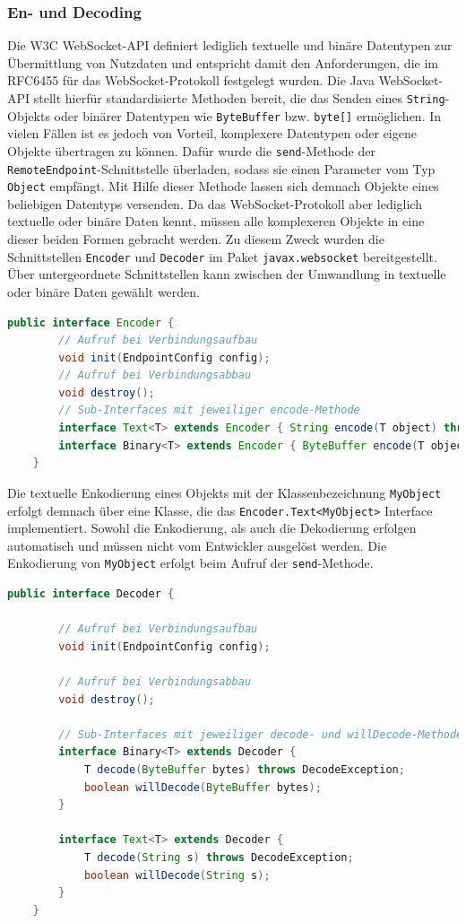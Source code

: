 \documentclass[11pt,a4paper,titlepage]{scrartcl}
\numberwithin{equation}{section}
\begin{document}
\subsubsection{En- und Decoding}\label{subsubsec:DeEnCoding}
Die W3C WebSocket-API definiert lediglich textuelle und binäre Datentypen zur Übermittlung von Nutzdaten und entspricht damit den Anforderungen, die im RFC6455 für das WebSocket-Protokoll festgelegt wurden. Die Java WebSocket-API stellt hierfür standardisierte Methoden bereit, die das Senden eines \texttt{String}-Objekts oder binärer Datentypen wie \texttt{ByteBuffer} bzw. \texttt{byte[]} ermöglichen. In vielen Fällen ist es jedoch von Vorteil, komplexere Datentypen oder eigene Objekte übertragen zu können. Dafür wurde die \texttt{send}-Methode der \texttt{RemoteEndpoint}-Schnittstelle überladen, sodass sie einen Parameter vom Typ \texttt{Object} empfängt. Mit Hilfe dieser Methode lassen sich demnach Objekte eines beliebigen Datentyps versenden. Da das WebSocket-Protokoll aber lediglich textuelle oder binäre Daten kennt, müssen alle komplexeren Objekte in eine dieser beiden Formen gebracht werden. Zu diesem Zweck wurden die Schnittstellen \texttt{Encoder} und \texttt{Decoder} im Paket \texttt{javax.websocket} bereitgestellt. Über untergeordnete Schnittstellen kann zwischen der Umwandlung in textuelle oder binäre Daten gewählt werden. \medskip

\begin{lstlisting}[frame=single, language=Java, caption=Java: Encoder Interface]
	public interface Encoder {
		// Aufruf bei Verbindungsaufbau
		void init(EndpointConfig config);
		// Aufruf bei Verbindungsabbau
		void destroy();
		// Sub-Interfaces mit jeweiliger encode-Methode
		interface Text<T> extends Encoder { String encode(T object) throws EncodeException; }
		interface Binary<T> extends Encoder { ByteBuffer encode(T object) throws EncodeException; }
	}
\end{lstlisting}

\noindent Die textuelle Enkodierung eines Objekts mit der Klassenbezeichnung \texttt{MyObject} erfolgt demnach über eine Klasse, die das \texttt{Encoder.Text<MyObject>} Interface implementiert. Sowohl die Enkodierung, als auch die Dekodierung erfolgen automatisch und müssen nicht vom Entwickler ausgelöst werden. Die Enkodierung von \texttt{MyObject} erfolgt beim Aufruf der \texttt{send}-Methode. \medskip

\begin{lstlisting}[frame=single, language=Java, caption=Java: Decoder Interface]
	public interface Decoder {
	
		// Aufruf bei Verbindungsaufbau
		void init(EndpointConfig config);
		
		// Aufruf bei Verbindungsabbau
		void destroy();
		
		// Sub-Interfaces mit jeweiliger decode- und willDecode-Methode
		interface Binary<T> extends Decoder {
			T decode(ByteBuffer bytes) throws DecodeException;
			boolean willDecode(ByteBuffer bytes);
		}
		
		interface Text<T> extends Decoder {
			T decode(String s) throws DecodeException;
			boolean willDecode(String s);
		}
	}
\end{lstlisting}
\end{document}
